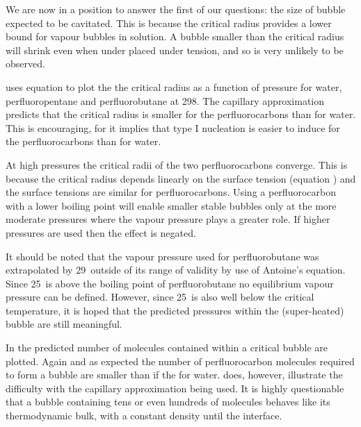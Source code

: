 We are now in a position to answer the first of our questions: the size of bubble expected to be cavitated.
This is because the critical radius provides  a lower bound for vapour bubbles in solution.
A bubble smaller than the critical radius will shrink even when under placed under tension,
and so is very unlikely to be observed.  


 uses equation  to plot the the critical radius as a function of pressure  for water, perfluoropentane and perfluorobutane
at  \unit{298}\kelvin.
The capillary approximation predicts that the critical radius is smaller for the perfluorocarbons than for water.
This is  encouraging, for it implies that type I nucleation is easier to induce for the perfluorocarbons than for water.

At high pressures the critical radii of the two perfluorocarbons converge.
This is because the critical radius depends linearly on the surface tension (equation )
and the surface tensions are similar for perfluorocarbons.
Using a perfluorocarbon with a lower boiling point will enable smaller stable bubbles only at the more moderate  pressures where the vapour pressure plays a greater role.  
If higher pressures are used then the effect is negated.

It should be noted that the vapour pressure used for perfluorobutane was extrapolated by \unit{29}\degreecelsius\  outside of its range of validity\cite{NISTdata}
 by use of Antoine's equation.
Since \unit{25}\degreecelsius\ is above the boiling point of perfluorobutane no  equilibrium vapour pressure can be defined.
However, since \unit{25}\degreecelsius\ is also well below the critical temperature, %
it is hoped that the predicted pressures within the (super-heated) bubble are still meaningful.


In   the predicted number of molecules contained within a critical bubble are plotted.
Again and as expected the number of perfluorocarbon molecules required to form a bubble are smaller than if the for water.
 does, however, illustrate  the difficulty with the capillary approximation being used.
It is highly questionable that a bubble containing tens or even hundreds of molecules behaves like its thermodynamic bulk, with a constant density until the interface.



